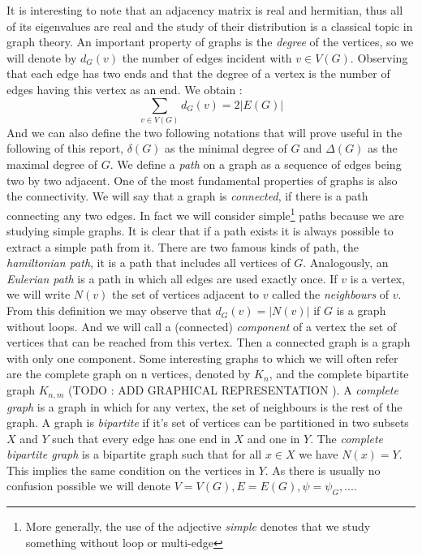 It is interesting to note that an adjacency matrix is real and hermitian, thus all of its eigenvalues are real and the study of their distribution is a classical topic in graph theory.
\newline
An important property of graphs is the \emph{degree} of the vertices, so we will denote by $d_G(v)$ the number of edges incident with $v \in V(G)$.
Observing that each edge has two ends and that the degree of a vertex is the number of edges having this vertex as an end. We obtain :
\begin{equation}
	\sum_{v\in V(G)} d_G(v) = 2 |E(G)|
\end{equation}
And we can also define the two following notations that will prove useful in the following of this report, $\delta(G)$ as the minimal degree of $G$ and $\Delta(G)$ as the maximal degree of $G$.
\newline
We define a \emph{path} on a graph as a sequence of edges being two by two adjacent. 
One of the most fundamental properties of graphs is also the connectivity.
We will say that a graph is \emph{connected}, if there is a path connecting any two edges. 
In fact we will consider simple\footnote{ More generally, the use of the adjective \emph{simple} denotes that we study something without loop or multi-edge}  paths because we are studying simple graphs.
It is clear that if a path exists it is always possible to extract a simple path from it.
There are two famous kinds of path, the \emph{hamiltonian path}, it is a path that includes all vertices of $G$. Analogously, an \emph{Eulerian path} is a path in which all edges are used exactly once.
\newline
If $v$ is a vertex, we will write $N(v)$ the set of vertices adjacent to $v$ called the \emph{neighbours} of $v$.
From this definition we may observe that $d_G(v) = |N(v)|$ if $G$ is a graph without loops. 
And we will call a (connected) \emph{component} of a vertex the set of vertices that can be reached from this vertex. 
Then a connected graph is a graph with only one component.
\newline
Some interesting graphs to which we will often refer are the complete graph on n vertices, denoted by $K_n$, and the complete bipartite graph $K_{n,m}$ (TODO : ADD GRAPHICAL REPRESENTATION ). 
A \emph{complete graph} is a graph in which for any vertex, the set of neighbours is the rest of the graph. 
A graph is \emph{bipartite} if it's set of vertices can be partitioned in two subsets $X$ and $Y$ such that every edge has one end in $X$ and one in $Y$. 
The \emph{complete bipartite graph} is a bipartite graph such that for all $x \in X$ we have $N(x) = Y$. 
This implies the same condition on the vertices in $Y$.
\newline
As there is usually no confusion possible we will denote $V = V(G), E =E(G), \psi = \psi_G, ...$. 


